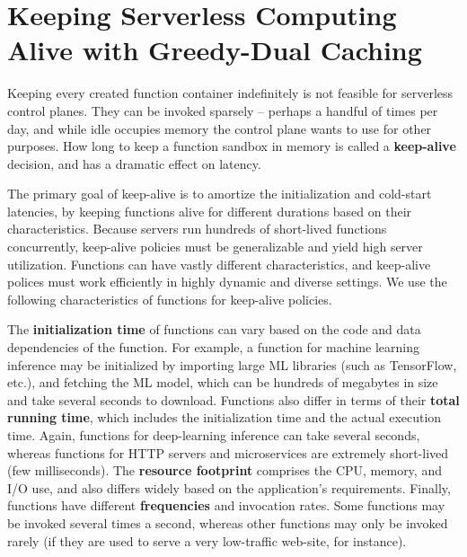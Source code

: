 \chapter{Keeping Serverless Computing Alive with Greedy-Dual Caching}
\label{chap:faascache}

Keeping every created function container indefinitely is not feasible for serverless control planes.
They can be invoked sparsely -- perhaps a handful of times per day, and while idle occupies memory the control plane wants to use for other purposes.
How long to keep a function sandbox in memory is called a \textbf{keep-alive} decision, and has a dramatic effect on latency.

The primary goal of keep-alive is to amortize the initialization and cold-start latencies, by keeping functions alive for different durations based on their characteristics. 
Because servers run hundreds of short-lived functions concurrently, keep-alive policies must be generalizable and yield high server utilization. 
Functions can have vastly different characteristics, and keep-alive polices must work efficiently in highly dynamic and diverse settings.
We use the following characteristics of functions for keep-alive policies.

The \textbf{initialization time} of functions can vary based on the code and data dependencies of the function.  
For example, a function for machine learning inference may be initialized by importing large ML libraries (such as TensorFlow, etc.), and fetching the ML model, which can be hundreds of megabytes in size and take several seconds to download. 
Functions also differ in terms of their \textbf{total running time}, which includes the initialization time and the actual execution time. 
Again, functions for deep-learning inference can take several seconds, whereas functions for HTTP servers and microservices are extremely short-lived (few milliseconds). 
The \textbf{resource footprint} comprises the CPU, memory, and I/O use, and also differs widely based on the application's requirements. 
Finally, functions have different \textbf{frequencies} and invocation rates. Some functions may be invoked several times a second, whereas other functions may only be invoked rarely (if they are used to serve a very low-traffic web-site, for instance). 








